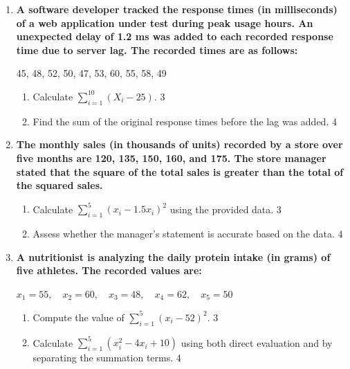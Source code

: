 \documentclass[a4paper,oneside]{book}
\begin{document}
\begin{enumerate}
  \item
\textbf{A software developer tracked the response times (in milliseconds) 
of a web application under test during peak usage hours. An unexpected 
delay of 1.2 ms was added to each recorded response time due to server
lag. The recorded times are as follows:}

\begin{center}
45, 48, 52, 50, 47, 53, 60, 55, 58, 49
\end{center}

\begin{enumerate}
    \item  
    Calculate $\displaystyle \sum_{i=1}^{10} (X_i - 25)$. \hfill 3
    \item
    Find the sum of the original response times before the lag was added. \hfill 4
\end{enumerate}

  
  \item
\textbf{The monthly sales (in thousands of units) recorded by a store over 
five months are 120, 135, 150, 160, and 175. The store manager 
stated that the square of the total sales is greater than the total of 
the squared sales.}

\begin{enumerate}
    \item  
    Calculate $\displaystyle \sum_{i=1}^5 (x_i - 1.5x_i)^2$ using the 
    provided data. \hfill 3
    \item
    Assess whether the manager’s statement is accurate based on the data. \hfill 4
\end{enumerate}

  \item  
  \textbf{A nutritionist is analyzing the daily protein intake (in grams) of five athletes.  
  The recorded values are:}  
  \begin{center}
  $x_1 = 55,\quad x_2 = 60,\quad x_3 = 48,\quad x_4 = 62,\quad x_5 = 50$
  \end{center}

  \begin{enumerate}
    \item  
    Compute the value of $\displaystyle \sum_{i=1}^5 (x_i - 52)^2$. \hfill 3

    \item  
    Calculate $\displaystyle \sum_{i=1}^5 (x_i^2 - 4x_i + 10)$ using both direct evaluation and by separating the summation terms. \hfill 4
  \end{enumerate}


\end{enumerate}
\end{document}
